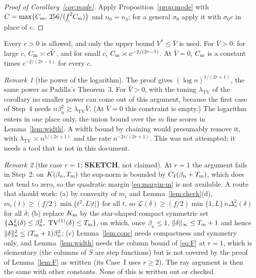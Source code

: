 \documentclass[11pt]{article}
\theoremstyle{definition}
\theoremstyle{remark}
\newtheorem{remark}{Remark}
\newcommand{\TV}{\mathrm{TV}}
\newcommand{\lamtv}{\lambda_{\TV}}
\newcommand{\Lm}{\mathcal L}
\newcommand{\fl}{\underline f}
\newcommand{\Vb}{\bar V}
\newcommand{\nn}[1]{\|#1\|_n}
\begin{document}
\begin{proof}[Proof of Corollary~\ref{cor:mode}]
Apply Proposition~\ref{prop:mode} with $C=\max\{C_{\rm m},\,256/(\fl^2C_{\rm m})\}$ and $n_0=n_4$; for a general $\sigma_0$ apply it with $\sigma_0c$ in place of $c$.
\end{proof}

\noindent Every $c>0$ is allowed, and only the upper bound $V^{*}\le\Vb$ is used. For $\Vb>0$: for large $c$, $C_{\rm m}\asymp c\Vb$, and for small $c$, $C_{\rm m}\asymp c^{-2/(2r-1)}$. At $\Vb=0$, $C_{\rm m}$ is a constant times $c^{-2/(2r-1)}$ for every $c$.

\begin{remark}[the power of the logarithm]\label{rem:modelog}
The proof gives $(\log n)^{1/(2r+1)}$, the same power as Padilla's Theorem~3. For $\Vb>0$, with the tuning $\lamtv$ of the corollary no smaller power can come out of this argument, because the first case of Step~4 needs $n\beta_n^2\gtrsim\lamtv\Vb$. (At $\Vb=0$ this constraint is empty.) The logarithm enters in one place only, the union bound over the $m$ fine scores in Lemma~\ref{lem:width}. A width bound by chaining would presumably remove it, with $\lamtv\asymp n^{1/(2r+1)}$ and the rate $n^{-2r/(2r+1)}$. This was not attempted; it needs a tool that is not in this document.
\end{remark}

\begin{remark}[the case $r=1$; \textbf{SKETCH}, not claimed]\label{rem:mode1}
At $r=1$ the argument fails in Step~2: on $K(\beta_n,T_{\rm m})$ the sup-norm is bounded by $C_I(\beta_n+T_{\rm m})$, which does not tend to zero, so the quadratic margin \eqref{eq:margin-m} is not available. A route that should work: (a) by convexity of $m_i$ and Lemma~\ref{lem:check}(d), $m_i(t)\ge(\fl/2)\min\{t^2,L|t|\}$ for all $t$, so $\Lm(\delta)\ge(\fl/2)\min\{1,L\}\,n\Delta_n^2(\delta)$ for all $\delta$; (b) replace $K_{\rm m}$ by the star-shaped compact symmetric set $\{\Delta_n^2(\delta)\le\beta_n^2,\ \TV^{(1)}(\delta)\le T_{\rm m}\}$, on which, once $\beta_n\le1$, $\|\delta\|_\infty\le T_{\rm m}+1$ and hence $\nn{\delta}^2\le(T_{\rm m}+1)\beta_n^2$; (c) Lemma~\ref{lem:conc} needs compactness and symmetry only, and Lemma~\ref{lem:width} needs the column bound of \eqref{eq:F} at $r=1$, which is elementary (the columns of $S$ are step functions) but is not covered by the proof of Lemma~\ref{lem:F} as written (its Case~I uses $r\ge2$). The ray argument is then the same with other constants. None of this is written out or checked.
\end{remark}
\end{document}
